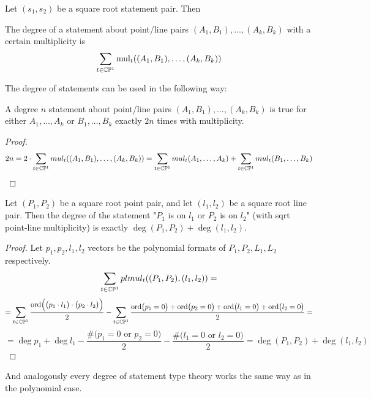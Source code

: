 \documentclass[a4paper]{article}
\newcommand{\ord}{\operatorname{ord}}
\begin{document}
\begin{theorem}
    Let $(s_1, s_2)$ be a square root statement pair. Then
\end{theorem}






\begin{definition}
    The degree of a statement about point/line pairs $(A_1,B_1),\ldots, (A_k,B_k)$ with a certain multiplicity is
    $$\sum_{t\in\mathbb{C}\mathbb{P}^1} \operatorname{mul}_t((A_1,B_1),\ldots, (A_k,B_k))$$
\end{definition}


The degree of statements can be used in the following way:

\begin{theorem}
    A degree $n$ statement about point/line pairs $(A_1,B_1),\ldots, (A_k,B_k)$ is true for either $A_1,\ldots, A_k$ or $B_1,\ldots, B_k$ exactly $2n$ times with multiplicity.
\end{theorem}
\begin{proof} $$2n=2\cdot\sum_{t\in\mathbb{C}\mathbb{P}^1} mul_t((A_1,B_1),\ldots, (A_k,B_k))=\sum_{t\in\mathbb{C}\mathbb{P}^1} mul_t(A_1,\ldots, A_k)+\sum_{t\in\mathbb{C}\mathbb{P}^1} mul_t(B_1,\ldots, B_k)$$
\end{proof}

\begin{theorem}
    Let $(P_1,P_2)$ be a square root point pair, and let $(l_1,l_2)$ be a square root line pair. Then the degree of the statement "$P_1$ is on $l_1$ or $P_2$ is on $l_2$" (with sqrt point-line multiplicity) is exactly $\deg (P_1,P_2)+ \deg (l_1,l_2)$.
\end{theorem}
\begin{proof}
    Let $p_1,p_2,l_1,l_2$ vectors be the polynomial formats of $P_1,P_2,L_1,L_2$ respectively.
    $$\sum_{t\in\mathbb{C}\mathbb{P}^1}plmul_t((P_1,P_2),(l_1,l_2))=$$
    $$=\sum_{t\in\cc\pp^1}\frac{\ord\Bigl(\bigl(p_1\cdot l_1\bigr)\cdot \bigl(p_2\cdot l_2\bigr)\Bigr)}{2}-\sum_{t\in\cc\pp^1}\frac{\ord\bigl(p_1=0\bigr)+\ord\bigl(p_2=0\bigr) +\ord\bigl(l_1=0\bigr)+\ord\bigl(l_2=0\bigr)}{2}=$$
    $$=\deg p_1+\deg l_1-\frac{\#\bigl(p_1=0\text{ or } p_2=0\bigr)}{2}-\frac{\#\bigl(l_1=0\text{ or } l_2=0\bigr)}{2}=\deg (P_1,P_2)+ \deg (l_1,l_2)$$
\end{proof}
And analogously every degree of statement type theory works the same way as in the polynomial case.
\end{document}
